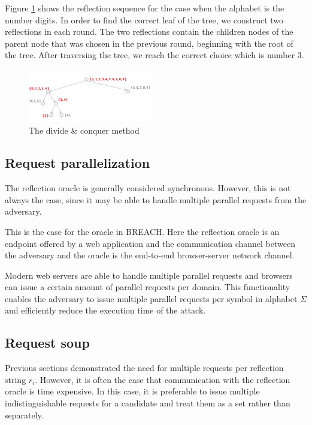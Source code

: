 \documentclass[conference, letterpaper, 10pt]{IEEEtran}
\begin{document}
Figure \ref{fig:divide_and_conquer} shows the reflection sequence for the case
when the alphabet is the number digits. In order to find the correct leaf of the
tree, we construct two reflections in each round. The two reflections contain
the children nodes of the parent node that was chosen in the previous round,
beginning with the root of the tree. After traversing the tree, we reach the
correct choice which is number 3.

   \begin{figure}[thpb]
      \centering
          \includegraphics[width=0.48\textwidth]{divide_and_conquer.png}
      \caption{The divide \& conquer method}
      \label{fig:divide_and_conquer}
   \end{figure}

\subsection{Request parallelization}\label{subsec:parallel}
The reflection oracle is generally considered synchronous. However, this is not
always the case, since it may be able to handle multiple parallel requests from
the adversary.

This is the case for the oracle in BREACH. Here the reflection oracle is an endpoint
offered by a web application and the communication channel between the adversary
and the oracle is the end-to-end browser-server network channel.

Modern web servers are able to handle multiple parallel requests and
browsers can issue a certain amount of parallel requests per domain. This
functionality enables the adversary to issue multiple parallel requests per
symbol in alphabet $\Sigma$ and efficiently reduce the execution time of
the attack.

\subsection{Request soup}
Previous sections demonstrated the need for multiple requests per reflection
string $r_i$. However, it is often the case that communication with the
reflection oracle is time
expensive. In this case, it is preferable to issue multiple indistinguishable
requests for a candidate and treat them as a set rather than separately.
\end{document}

